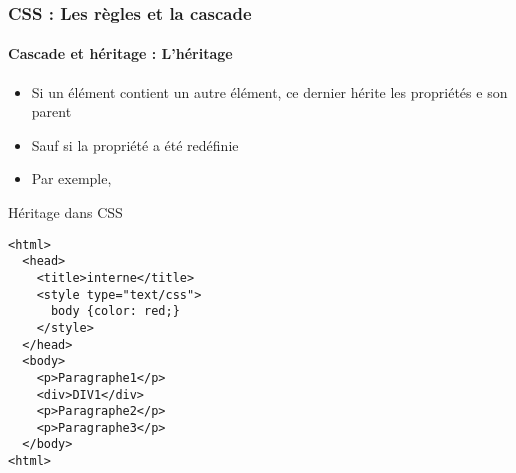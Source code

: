 \documentclass[xcolor=table]{beamer}
\begin{document}
\begin{frame}[fragile]
\frametitle{CSS : Les règles et la cascade}
\framesubtitle{Cascade et héritage : L'héritage}

\begin{minipage}{0.60\textwidth}
\begin{itemize}
	\item Si un élément contient un autre élément, ce dernier hérite les propriétés e son parent
	\item Sauf si la propriété a été redéfinie
	\item Par exemple, 
\end{itemize}
\end{minipage}
%
\begin{minipage}{0.38\textwidth}
\begin{block}{Héritage dans CSS}
\lstset{escapeinside=**}
\scriptsize\bfseries
\begin{lstlisting}[language={HTML5}]
<html>
  <head>
    <title>interne</title>
    <style type="text/css">
      body {color: red;}
    </style>
  </head>
  <body>
    <p>Paragraphe1</p>
    <div>DIV1</div>
    <p>Paragraphe2</p>
    <p>Paragraphe3</p>
  </body>
<html>
\end{lstlisting}
\end{block}
\end{minipage}
\end{frame}
\end{document}
